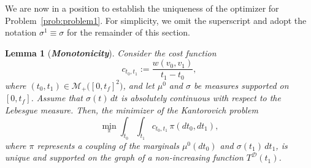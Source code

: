 \documentclass[11pt]{article}
\newcommand{\calT}{{\mathcal T}}
\newtheorem{lemma}{Lemma}
\begin{document}


We are now in a position to establish the uniqueness of the optimizer for Problem~\ref{prob:problem1}. For simplicity, we omit the superscript and adopt the notation $\sigma^{1} \equiv \sigma$ for the remainder of this section.

\begin{lemma}[\bf \textit{Monotonicity}]\label{lemma:monotone}
Consider the cost function
$$
c_{t_0,t_1} := \frac{w(v_0, v_1)}{t_1 - t_0},
$$
where $(t_0,t_1) \in \mathcal{M}_+\big([0, t_f]^2\big)$, and let $\mu^0$ and $\sigma$ be measures supported on $[0,t_f]$. Assume that $\sigma(t)\,dt$ is absolutely continuous with respect to the Lebesgue measure. Then, the minimizer of the Kantorovich problem
$$
\min_{\pi} \int_{t_0} \int_{t_1} c_{t_0,t_1} \,\pi(dt_0,dt_1),
$$
where $\pi$ represents a coupling of the marginals $\mu^0(dt_0)$ and $\sigma(t_1)\,dt_1$, is unique and supported on the graph of a non-increasing function $T^{\mathcal D}(t_1)$.
\end{lemma}
\end{document}
